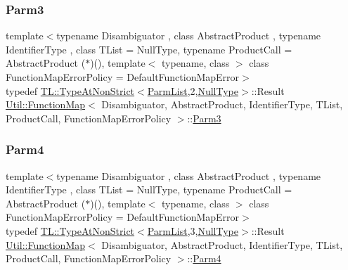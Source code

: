 \subsubsection{\texorpdfstring{Parm3}{Parm3}\hspace{0.1cm}{\footnotesize\ttfamily [3/3]}}
{\footnotesize\ttfamily template$<$typename Disambiguator , class Abstract\+Product , typename Identifier\+Type , class T\+List  = Null\+Type, typename Product\+Call  = Abstract\+Product ($\ast$)(), template$<$ typename, class $>$ class Function\+Map\+Error\+Policy = Default\+Function\+Map\+Error$>$ \\
typedef \mbox{\hyperlink{structUtil_1_1TL_1_1TypeAtNonStrict}{T\+L\+::\+Type\+At\+Non\+Strict}}$<$\mbox{\hyperlink{classUtil_1_1FunctionMap_a6cf0e6766cf6f20642ba61c4994bb477}{Parm\+List}},2,\mbox{\hyperlink{classUtil_1_1NullType}{Null\+Type}}$>$\+::Result \mbox{\hyperlink{classUtil_1_1FunctionMap}{Util\+::\+Function\+Map}}$<$ Disambiguator, Abstract\+Product, Identifier\+Type, T\+List, Product\+Call, Function\+Map\+Error\+Policy $>$\+::\mbox{\hyperlink{classUtil_1_1FunctionMap_a4578d42cd0723beba85654aa774d0145}{Parm3}}}

\mbox{\label{classUtil_1_1FunctionMap_a912703c1f39a6e219b2449183e48fb07}} 
\subsubsection{\texorpdfstring{Parm4}{Parm4}\hspace{0.1cm}{\footnotesize\ttfamily [1/3]}}
{\footnotesize\ttfamily template$<$typename Disambiguator , class Abstract\+Product , typename Identifier\+Type , class T\+List  = Null\+Type, typename Product\+Call  = Abstract\+Product ($\ast$)(), template$<$ typename, class $>$ class Function\+Map\+Error\+Policy = Default\+Function\+Map\+Error$>$ \\
typedef \mbox{\hyperlink{structUtil_1_1TL_1_1TypeAtNonStrict}{T\+L\+::\+Type\+At\+Non\+Strict}}$<$\mbox{\hyperlink{classUtil_1_1FunctionMap_a6cf0e6766cf6f20642ba61c4994bb477}{Parm\+List}},3,\mbox{\hyperlink{classUtil_1_1NullType}{Null\+Type}}$>$\+::Result \mbox{\hyperlink{classUtil_1_1FunctionMap}{Util\+::\+Function\+Map}}$<$ Disambiguator, Abstract\+Product, Identifier\+Type, T\+List, Product\+Call, Function\+Map\+Error\+Policy $>$\+::\mbox{\hyperlink{classUtil_1_1FunctionMap_a912703c1f39a6e219b2449183e48fb07}{Parm4}}}

